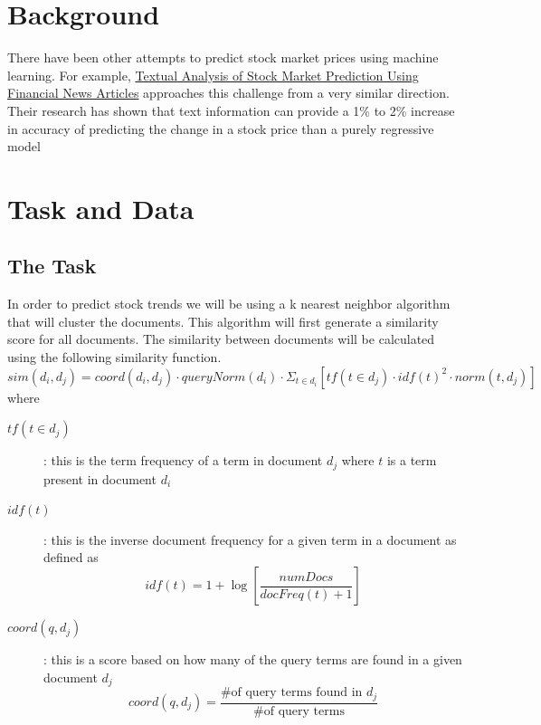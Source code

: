 \documentclass[11pt,letterpaper]{article}
\newcommand{\blue}[1]{\textcolor{RoyalBlue}{#1}}
\newcommand{\instructions}[1]{\blue{\textit{#1}}}
\begin{document}
\section{Background}
\label{sec:background}
There have been other attempts to predict stock market prices using machine
learning. For example, \href{http://ailab.arizona.edu/intranet/papers/Textual\%20Analysis\%20of\%20Stock\%20Market.pdf}{Textual Analysis of Stock Market Prediction Using Financial News Articles}
approaches this challenge from a very similar direction. Their research has
shown that text information can provide a 1\% to 2\% increase in accuracy of
predicting the change in a stock price than a purely regressive model ~\cite{arizona}

\section{Task and Data}
\label{sec:taskAndData}

\subsection{The Task}
\label{sec:task}
In order to predict stock trends we will be using a k nearest neighbor
algorithm that will cluster the documents. This algorithm will
first generate a similarity score for all documents.
The similarity between documents will be calculated using the
following similarity function. ~\cite{similarity}
\begin{equation}\label{doc:sim}
	sim(d_i, d_j) = coord(d_i, d_j) \cdot queryNorm(d_i) \cdot \Sigma_{t \in d_i} \left[ tf(t \in d_j) \cdot idf(t)^2 \cdot norm(t,d_j) \right]
\end{equation}
where
\begin{description}
	\item[\(tf(t \in d_j)\)] : this is the term frequency of a term in document \(d_j\) where \(t\) is a term present in document \(d_i\)
	\item[\(idf(t)\)] : this is the inverse document frequency for a given term in a document as defined as
	\begin{equation}\label{doc:idf}
		idf(t) = 1 + \log \left[ \frac{numDocs}{docFreq(t) + 1} \right]
	\end{equation}
	\item[\(coord(q,d_j)\)] : this is a score based on how many of the query terms are found in a given document \(d_j\)
	\begin{equation}\label{doc:coord}
		coord(q,d_j) = \frac{\text{\# of query terms found in } d_j }{\text{\# of query terms}}
	\end{equation}
\end{description}
\end{document}

